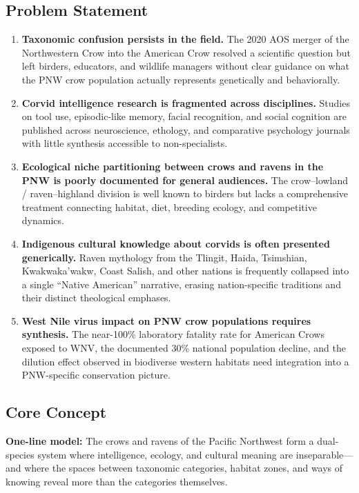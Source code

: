 \documentclass[11pt,letterpaper]{article}
\begin{document}
\subsection{Problem Statement}

\begin{enumerate}[leftmargin=2em]
  \item \textbf{Taxonomic confusion persists in the field.} The 2020 AOS merger of the Northwestern Crow into the American Crow resolved a scientific question but left birders, educators, and wildlife managers without clear guidance on what the PNW crow population actually represents genetically and behaviorally.

  \item \textbf{Corvid intelligence research is fragmented across disciplines.} Studies on tool use, episodic-like memory, facial recognition, and social cognition are published across neuroscience, ethology, and comparative psychology journals with little synthesis accessible to non-specialists.

  \item \textbf{Ecological niche partitioning between crows and ravens in the PNW is poorly documented for general audiences.} The crow--lowland / raven--highland division is well known to birders but lacks a comprehensive treatment connecting habitat, diet, breeding ecology, and competitive dynamics.

  \item \textbf{Indigenous cultural knowledge about corvids is often presented generically.} Raven mythology from the Tlingit, Haida, Tsimshian, Kwakwaka'wakw, Coast Salish, and other nations is frequently collapsed into a single ``Native American'' narrative, erasing nation-specific traditions and their distinct theological emphases.

  \item \textbf{West Nile virus impact on PNW crow populations requires synthesis.} The near-100\% laboratory fatality rate for American Crows exposed to WNV, the documented 30\% national population decline, and the dilution effect observed in biodiverse western habitats need integration into a PNW-specific conservation picture.
\end{enumerate}

\subsection{Core Concept}

\textbf{One-line model:} The crows and ravens of the Pacific Northwest form a dual-species system where intelligence, ecology, and cultural meaning are inseparable---and where the spaces between taxonomic categories, habitat zones, and ways of knowing reveal more than the categories themselves.
\end{document}

